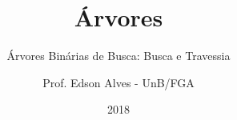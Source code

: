 \title{Árvores}
\subtitle{Árvores Binárias de Busca: Busca e Travessia}
\author{Prof. Edson Alves - UnB/FGA}
\date{2018}
